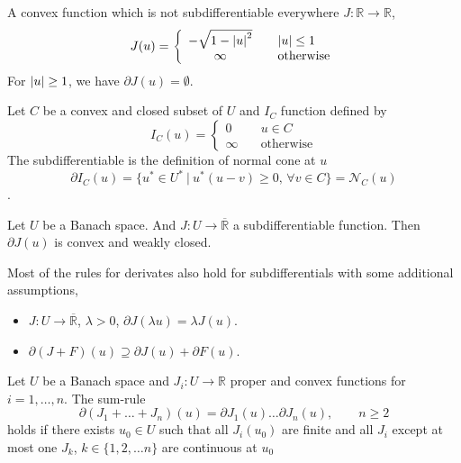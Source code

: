 \begin{example}
	A convex function which is not subdifferentiable everywhere $J:\mathbb{R} \rightarrow \mathbb{R}$, 
	\begin{equation*}
		J(u)=\left\lbrace\begin{array}{cl}
		 -\sqrt{1-\left|u\right|^2} &\quad \left|u\right|\leq 1 \\
		 \infty &\quad \text{otherwise}
		\end{array}
	\right.
	\end{equation*}
	For $\left|u\right|\geq 1$, we have $\partial J(u) = \emptyset$.
\end{example}

\begin{example}
	Let $C$ be a convex and closed subset of $U$ and $I_C$ function defined by
	\[
		I_C (u)=
		\left\lbrace
		\begin{array}{cl}
			0 \quad& u\in C \\
			\infty \quad& \text{otherwise}
		\end{array}
		\right.
	\]
	The subdifferentiable is the definition of normal cone at $u$
	\[\partial I_C (u)=\lbrace u^* \in U^* \ | \ u^*(u-v)\geq 0, \, \forall v \in C\rbrace = \mathcal{N}_C(u)\].

\end{example}

\begin{theorem}
	Let $U$ be a Banach space. And $J: U\rightarrow \overline{\mathbb{R}}$ a subdifferentiable function. Then $\partial J(u)$ is convex and weakly closed.
\end{theorem}

\begin{remark}
	Most of the rules for derivates also hold for subdifferentials with some additional assumptions,
	\begin{itemize}
		\item $J:U\rightarrow \overline{\mathbb{R}}$, $\lambda > 0$, $\partial J(\lambda u)=\lambda J(u)$.
		\item $\partial(J+F)(u) \supseteq \partial J(u)+ \partial F(u)$.
	\end{itemize}
\end{remark}

\begin{theorem}
	\label{th5. Moreau-Rockafellar}
	Let $U$ be a Banach space and $J_i: U\rightarrow \mathbb{R}$ proper and convex functions for $i=1,\dots, n$.
	The sum-rule
	\[
		\partial(J_1+\dots+J_n)(u)=\partial J_1(u)\dots \partial J_n(u), \qquad n\geq 2
	\]
	holds if there exists $u_0 \in U$ such that all $J_i(u_0)$ are finite and all $J_i$ except at most one $J_k$, $k\in \lbrace 1,2,\dots n\rbrace$ are continuous at $u_0$
\end{theorem}